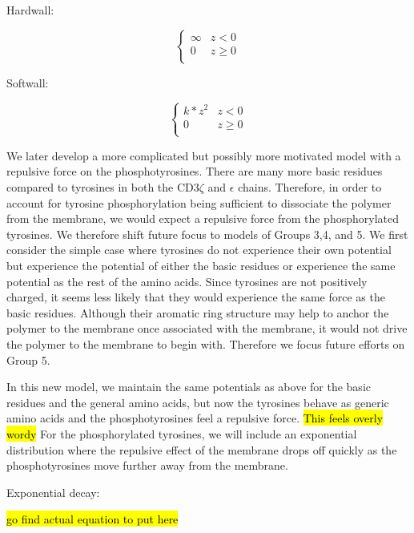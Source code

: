 \documentclass[../../AdvancementSummary.tex]{subfiles}
\begin{document}
Hardwall:

\begin{equation}\label{eq: hardwall}
\begin{cases}
\infty 	& z < 0\\
0 & z \geq 0 \\
\end{cases}
\end{equation}


Softwall:

\begin{equation}\label{eq: softwall}
\begin{cases}
k*z^2 	& z < 0\\
0 & z \geq 0 \\
\end{cases}
\end{equation}

We later develop a more complicated but possibly more motivated model with a repulsive force on the phosphotyrosines. There are many more basic residues compared to tyrosines in both the CD3$\zeta$ and $\epsilon$ chains.  Therefore, in order to account for tyrosine phosphorylation being sufficient to dissociate the polymer from the membrane, we would expect a repulsive force from the phosphorylated tyrosines. We therefore shift future focus to models of Groups 3,4, and 5. We first consider the simple case where tyrosines do not experience their own potential but experience the potential of either the basic residues or experience the same potential as the rest of the amino acids.  Since tyrosines are not positively charged, it seems less likely that they would experience the same force as the basic residues.  Although their aromatic ring structure may help to anchor the polymer to the membrane once associated with the membrane, it would not drive the polymer to the membrane to begin with. \cite{Lopez2015} Therefore we focus future efforts on Group 5.

In this new model, we maintain the same potentials as above for the basic residues and the general amino acids, but now the tyrosines behave as generic amino acids and the phosphotyrosines feel a repulsive force. \hl{This feels overly wordy} For the phosphorylated tyrosines, we will include an exponential distribution where the repulsive effect of the membrane drops off quickly as the phosphotyrosines move further away from the membrane.


Exponential decay:

\hl{go find actual equation to put here}
\end{document}
